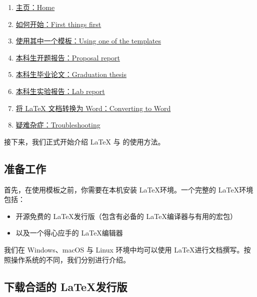 \begin{enumerate}
  \item \href{https://bithesis.bitnp.net/Guide/}{主页：Home}
  \item \href{https://bithesis.bitnp.net/Guide/1-Intro/First-things-first}{如何开始：First things first }
  \item \href{https://bithesis.bitnp.net/Guide/2-Usage/Downloading-and-using-templates}{使用其中一个模板：Using one of the templates}
  \item \href{https://bithesis.bitnp.net/Guide/3-Templates/Proposal-Report}{本科生开题报告：Proposal report}
  \item \href{https://bithesis.bitnp.net/Guide/3-Templates/Final-Graduation-Thesis}{本科生毕业论文：Graduation thesis}
  \item \href{https://bithesis.bitnp.net/Guide/3-Templates/Lab-Report}{本科生实验报告：Lab report}
  \item \href{https://bithesis.bitnp.net/Guide/4-Others/Converting-to-Word}{将 LaTeX 文档转换为 Word：Converting to Word}
  \item \href{https://bithesis.bitnp.net/Guide/4-Others/Troubleshooting}{疑难杂症：Troubleshooting}
\end{enumerate}

接下来，我们正式开始介绍 {\LaTeX} 与 {\BIThesis} 的使用方法。

\subsection{准备工作}
首先，在使用模板之前，你需要在本机安装 \LaTeX 环境。一个完整的 \LaTeX 环境包括：

\begin{itemize}
  \item 开源免费的 \LaTeX 发行版（包含有必备的 \LaTeX 编译器与有用的宏包）
  \item 以及一个得心应手的 \LaTeX 编辑器
\end{itemize}

我们在 Windows、macOS 与 Linux 环境中均可以使用 \LaTeX 进行文档撰写。按照操作系统的不同，我们分别进行介绍。

\subsection{下载合适的 \LaTeX 发行版}

